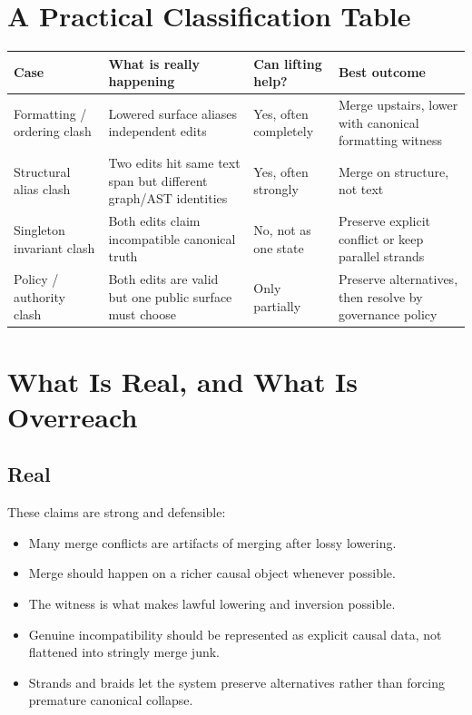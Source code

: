 \documentclass[11pt]{article}
\theoremstyle{definition}
\begin{document}
\section{A Practical Classification Table}

\begin{center}
\begin{tabular}{@{}p{3.2cm}p{3.7cm}p{3.0cm}p{3.2cm}@{}}
\toprule
Case & What is really happening & Can lifting help? & Best outcome \\
\midrule
Formatting / ordering clash & Lowered surface aliases independent edits & Yes, often completely & Merge upstairs, lower with canonical formatting witness \\
\addlinespace
Structural alias clash & Two edits hit same text span but different graph/AST identities & Yes, often strongly & Merge on structure, not text \\
\addlinespace
Singleton invariant clash & Both edits claim incompatible canonical truth & No, not as one state & Preserve explicit conflict or keep parallel strands \\
\addlinespace
Policy / authority clash & Both edits are valid but one public surface must choose & Only partially & Preserve alternatives, then resolve by governance policy \\
\bottomrule
\end{tabular}
\end{center}

\section{What Is Real, and What Is Overreach}

\subsection{Real}

These claims are strong and defensible:
\begin{itemize}[leftmargin=2em]
\item Many merge conflicts are artifacts of merging after lossy lowering.
\item Merge should happen on a richer causal object whenever possible.
\item The witness is what makes lawful lowering and inversion possible.
\item Genuine incompatibility should be represented as explicit causal data,
  not flattened into stringly merge junk.
\item Strands and braids let the system preserve alternatives rather than
  forcing premature canonical collapse.
\end{itemize}
\end{document}
